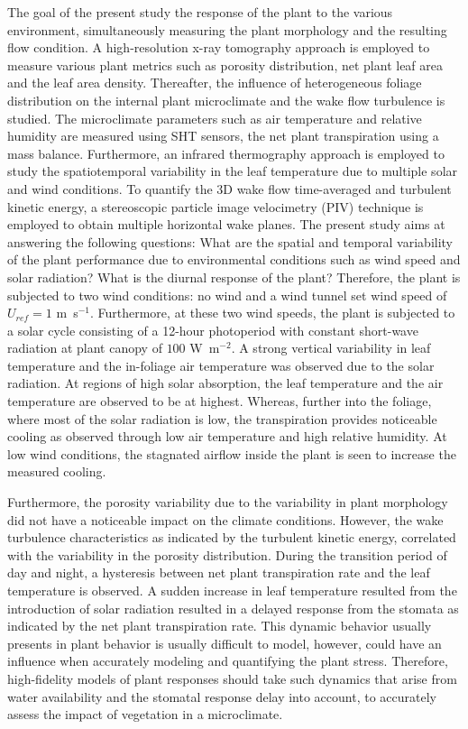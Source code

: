 The goal of the present study the response of the plant to the various environment, simultaneously measuring the plant morphology and the resulting flow condition. A high-resolution x-ray tomography approach is employed to measure various plant metrics such as porosity distribution, net plant leaf area and the leaf area density. Thereafter, the influence of heterogeneous foliage distribution on the internal plant microclimate and the wake flow turbulence is studied. The microclimate parameters such as air temperature and relative humidity are measured using SHT sensors, the net plant transpiration using a mass balance. Furthermore, an infrared thermography approach is employed to study the spatiotemporal variability in the leaf temperature due to multiple solar and wind conditions. To quantify the 3D wake flow time-averaged and turbulent kinetic energy, a stereoscopic particle image velocimetry (PIV) technique is employed to obtain multiple horizontal wake planes. The present study aims at answering the following questions: What are the spatial and temporal variability of the plant performance due to environmental conditions such as wind speed and solar radiation? What is the diurnal response of the plant? Therefore, the plant is subjected to two wind conditions: no wind and a wind tunnel set wind speed of $U_{ref}=1$ m~s$^{-1}$. Furthermore, at these two wind speeds, the plant is subjected to a solar cycle consisting of a 12-hour photoperiod with constant short-wave radiation at plant canopy of $100$ W~m$^{-2}$. A strong vertical variability in leaf temperature and the in-foliage air temperature was observed due to the solar radiation. At regions of high solar absorption, the leaf temperature and the air temperature are observed to be at highest. Whereas, further into the foliage, where most of the solar radiation is low, the transpiration provides noticeable cooling as observed through low air temperature and high relative humidity. At low wind conditions, the stagnated airflow inside the plant is seen to increase the measured cooling. 

Furthermore, the porosity variability due to the variability in plant morphology did not have a noticeable impact on the climate conditions. However, the wake turbulence characteristics as indicated by the turbulent kinetic energy, correlated with the variability in the porosity distribution. During the transition period of day and night, a hysteresis between net plant transpiration rate and the leaf temperature is observed. A sudden increase in leaf temperature resulted from the introduction of solar radiation resulted in a delayed response from the stomata as indicated by the net plant transpiration rate. This dynamic behavior usually presents in plant behavior is usually difficult to model, however, could have an influence when accurately modeling and quantifying the plant stress. Therefore, high-fidelity models of plant responses should take such dynamics that arise from water availability and the stomatal response delay into account, to accurately assess the impact of vegetation in a microclimate.


